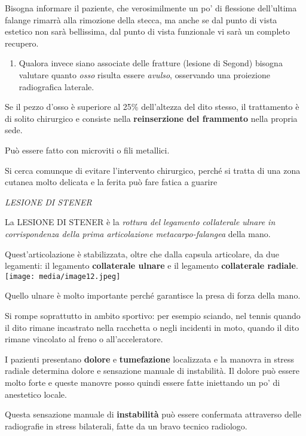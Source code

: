 \documentclass[]{article}
\begin{document}
Bisogna informare il paziente, che verosimilmente un po' di flessione
dell'ultima falange rimarrà alla rimozione della stecca, ma anche se dal
punto di vista estetico non sarà bellissima, dal punto di vista
funzionale vi sarà un completo recupero.

\begin{enumerate}
\def\labelenumi{\arabic{enumi}.}
\item
  Qualora invece siano associate delle fratture (lesione di Segond)
  bisogna valutare quanto \emph{osso} risulta essere \emph{avulso},
  osservando una proiezione radiografica laterale.
\end{enumerate}

Se il pezzo d'osso è superiore al 25\% dell'altezza del dito stesso, il
trattamento è di solito chirurgico e consiste nella \textbf{reinserzione
del frammento} nella propria sede.

Può essere fatto con microviti o fili metallici.

Si cerca comunque di evitare l'intervento chirurgico, perché si tratta
di una zona cutanea molto delicata e la ferita può fare fatica a guarire

\emph{LESIONE DI STENER}

La LESIONE DI STENER è la \emph{rottura del legamento collaterale ulnare
in corrispondenza della prima articolazione metacarpo-falangea} della
mano.

Quest'articolazione è stabilizzata, oltre che dalla capsula articolare,
da due legamenti: il legamento \textbf{collaterale ulnare} e il
legamento \textbf{collaterale radiale}.
\texttt{[image: media/image12.jpeg]}

Quello ulnare è molto importante perché garantisce la presa di forza
della mano.

Si rompe soprattutto in ambito sportivo: per esempio sciando, nel tennis
quando il dito rimane incastrato nella racchetta o negli incidenti in
moto, quando il dito rimane vincolato al freno o all'acceleratore.

I pazienti presentano \textbf{dolore} e \textbf{tumefazione} localizzata
e la manovra in stress radiale determina dolore e sensazione manuale di
instabilità. Il dolore può essere molto forte e queste manovre posso
quindi essere fatte iniettando un po' di anestetico locale.

Questa sensazione manuale di \textbf{instabilità} può essere confermata
attraverso delle radiografie in stress bilaterali, fatte da un bravo
tecnico radiologo.
\end{document}
